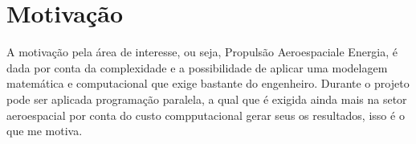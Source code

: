 \documentclass[12pt]{article} %
\begin{document}
	
	\section{Motivação}
	
		A motivação pela área de interesse, ou seja, Propulsão Aeroespaciale Energia, é dada por conta da complexidade e a possibilidade de aplicar uma modelagem matemática e computacional que exige bastante do engenheiro. Durante o projeto pode ser aplicada programação paralela, a qual que é exigida ainda mais na setor aeroespacial por conta do custo compputacional gerar seus os resultados, isso é o que me motiva. \cite{Silva2018}
\end{document}
